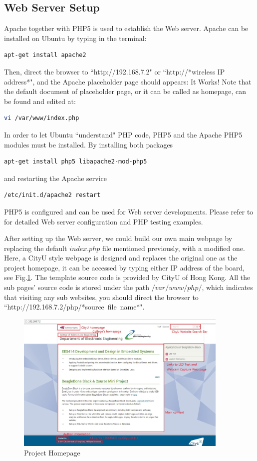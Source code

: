 \documentclass[12pt,journal,draftclsnofoot,onecolumn]{IEEEtran}
\begin{document}
\subsection{Web Server Setup}\label{Webser}
Apache together with PHP5 is used to establish the Web server. Apache can be installed on Ubuntu by typing in the terminal:
\begin{lstlisting}[language={bash}]
apt-get install apache2
\end{lstlisting}
Then, direct the browser to ``http://192.168.7.2" or ``http://*wireless IP address*", and the Apache placeholder page should appears: It Works! Note that the default document of placeholder page, or it can be called as homepage, can be found and edited at:
\begin{lstlisting}[language={bash}]
vi /var/www/index.php
\end{lstlisting}
	
In order to let Ubuntu  ``understand" PHP code, PHP5 and the Apache PHP5 modules must be installed. By installing both packages
\begin{lstlisting}[language={bash}]
apt-get install php5 libapache2-mod-php5
\end{lstlisting}
and restarting the Apache service
\begin{lstlisting}[language={bash}]
/etc/init.d/apache2 restart
\end{lstlisting}
PHP5 is configured and can be used for Web server developments. Please refer to \cite{Apache} for detailed Web server configuration and PHP testing examples.

After setting up the Web server, we could build our own main webpage by replacing the default $index.php$ file mentioned previously, with a modified one. Here, a CityU style webpage is designed and replaces the original one as the project homepage, it can be accessed by typing either IP address of the board, see Fig.\ref{mainpage}. The template source code is provided by CityU of Hong Kong. All the sub pages' source code is stored under the path $/var/www/php/$, which indicates that visiting any sub websites, you should direct the browser to ``http://192.168.7.2/php/*source\ file\ name*".
\begin{figure}[htb]
	\centering
	\includegraphics[width=4in]{./figs/mainpage.jpg}
	\caption{Project Homepage}
	\label{mainpage}
\end{figure}
	
\end{document}
